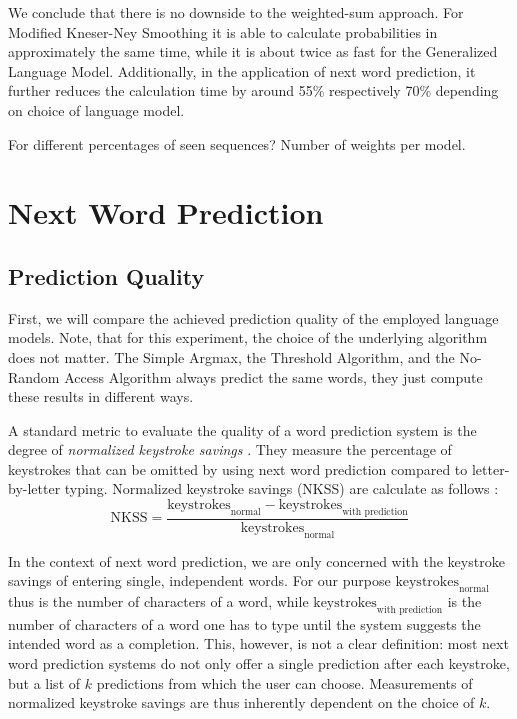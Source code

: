 We conclude that there is no downside to the weighted-sum approach.
For Modified Kneser-Ney Smoothing it is able to calculate probabilities in
approximately the same time, while it is about twice as fast for the
Generalized Language Model.
Additionally, in the application of next word prediction, it further reduces
the calculation time by around 55\% respectively 70\% depending on choice
of language model.

\begin{draft}
For different percentages of seen sequences?
Number of weights per model.
\end{draft}

\section{Next Word Prediction}
\label{sec:evaluation-topkjoin}

\subsection{Prediction Quality}
\label{subsec:evaluation-topkjoin-quality}

First, we will compare the achieved prediction quality of the employed
language models.
Note, that for this experiment, the choice of the underlying algorithm does not
matter.
The Simple Argmax, the Threshold Algorithm, and the No-Random Access Algorithm
always predict the same words, they just compute these results in different
ways.

A standard metric to evaluate the quality of a word prediction system is the
degree of \emph{normalized keystroke savings}
\parencite{Swiffin1987,Bickel2005,Trnka2011}.
They measure the percentage of keystrokes that can be omitted by using next
word prediction compared to letter-by-letter typing.
Normalized keystroke savings (NKSS) are calculate as follows
\parencite{Trnka2011}:
\begin{equation}
  \text{NKSS} = \frac{\text{keystrokes}_\text{normal} - \text{keystrokes}_\text{with prediction}}
                     {\text{keystrokes}_\text{normal}}
\end{equation}

In the context of next word prediction, we are only concerned with the keystroke
savings of entering single, independent words.
For our purpose $\text{keystrokes}_\text{normal}$ thus is the number of
characters of a word, while $\text{keystrokes}_\text{with prediction}$ is
the number of characters of a word one has to type until the system suggests
the intended word as a completion.
This, however, is not a clear definition: most next word prediction systems do
not only offer a single prediction after each keystroke, but a list of $k$
predictions from which the user can choose.
Measurements of normalized keystroke savings are thus inherently dependent on
the choice of $k$.

